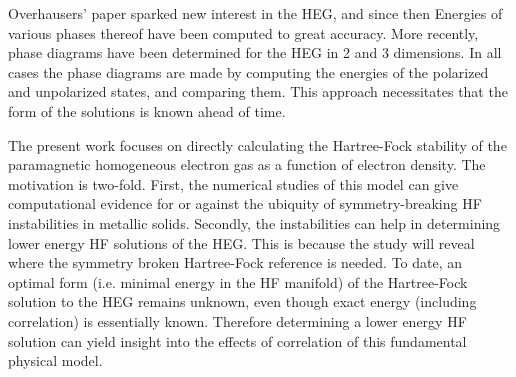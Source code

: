 \documentclass[preprint, journal=prl]{revtex4-1}
\begin{document}
  Overhausers' paper sparked new interest in the HEG, and since then Energies of various phases thereof have been computed to great accuracy\cite{Ceperley1980}. More recently, phase diagrams have been determined for the HEG in 2 and 3 dimensions\cite{Delyon2008, Bernu2011, Baguet2013}. In all cases the phase diagrams are made by computing the energies of the polarized and unpolarized states, and comparing them. This approach necessitates that the form of the solutions is known ahead of time. 
  
  The present work focuses on directly calculating the Hartree-Fock stability of the paramagnetic homogeneous electron gas as a function of electron density. The motivation is two-fold. First, the numerical studies of this model can give computational evidence for or against the ubiquity of symmetry-breaking HF instabilities in metallic solids. Secondly, the instabilities can help in determining lower energy HF solutions of the HEG. This is because the study will reveal where the symmetry broken Hartree-Fock reference is needed. To date, an optimal form (i.e. minimal energy in the HF manifold) of the Hartree-Fock solution to the HEG remains unknown, even though exact energy (including correlation) is essentially known. Therefore determining a lower energy HF solution can yield insight into the effects of correlation of this fundamental physical model.
        
  
\end{document}
